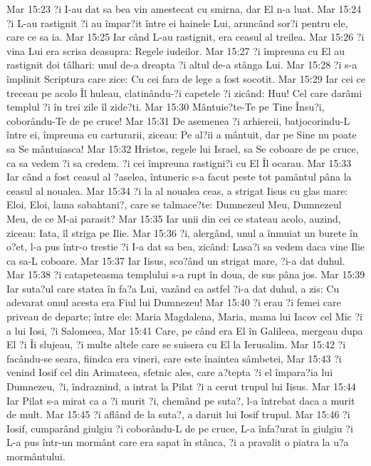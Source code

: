 Mar 15:23  ?i I-au dat sa bea vin amestecat cu smirna, dar El n-a luat.
Mar 15:24  ?i L-au rastignit ?i au împar?it între ei hainele Lui, aruncând sor?i pentru ele, care ce sa ia.
Mar 15:25  Iar când L-au rastignit, era ceasul al treilea.
Mar 15:26  ?i vina Lui era scrisa deasupra: Regele iudeilor.
Mar 15:27  ?i împreuna cu El au rastignit doi tâlhari: unul de-a dreapta ?i altul de-a stânga Lui.
Mar 15:28  ?i s-a împlinit Scriptura care zice: Cu cei fara de lege a fost socotit.
Mar 15:29  Iar cei ce treceau pe acolo Îl huleau, clatinându-?i capetele ?i zicând: Huu! Cel care darâmi templul ?i în trei zile îl zide?ti.
Mar 15:30  Mântuie?te-Te pe Tine Însu?i, coborându-Te de pe cruce!
Mar 15:31  De asemenea ?i arhiereii, batjocorindu-L între ei, împreuna cu carturarii, ziceau: Pe al?ii a mântuit, dar pe Sine nu poate sa Se mântuiasca!
Mar 15:32  Hristos, regele lui Israel, sa Se coboare de pe cruce, ca sa vedem ?i sa credem. ?i cei împreuna rastigni?i cu El Îl ocarau.
Mar 15:33  Iar când a fost ceasul al ?aselea, întuneric s-a facut peste tot pamântul pâna la ceasul al noualea.
Mar 15:34  ?i la al noualea ceas, a strigat Iisus cu glas mare: Eloi, Eloi, lama sabahtani?, care se talmace?te: Dumnezeul Meu, Dumnezeul Meu, de ce M-ai parasit?
Mar 15:35  Iar unii din cei ce stateau acolo, auzind, ziceau: Iata, îl striga pe Ilie.
Mar 15:36  ?i, alergând, unul a înmuiat un burete în o?et, l-a pus într-o trestie ?i I-a dat sa bea, zicând: Lasa?i sa vedem daca vine Ilie ca sa-L coboare.
Mar 15:37  Iar Iisus, sco?ând un strigat mare, ?i-a dat duhul.
Mar 15:38  ?i catapeteasma templului s-a rupt în doua, de sus pâna jos.
Mar 15:39  Iar suta?ul care statea în fa?a Lui, vazând ca astfel ?i-a dat duhul, a zis: Cu adevarat omul acesta era Fiul lui Dumnezeu!
Mar 15:40  ?i erau ?i femei care priveau de departe; între ele: Maria Magdalena, Maria, mama lui Iacov cel Mic ?i a lui Iosi, ?i Salomeea,
Mar 15:41  Care, pe când era El în Galileea, mergeau dupa El ?i Îi slujeau, ?i multe altele care se suisera cu El la Ierusalim.
Mar 15:42  ?i facându-se seara, fiindca era vineri, care este înaintea sâmbetei,
Mar 15:43  ?i venind Iosif cel din Arimateea, sfetnic ales, care a?tepta ?i el împara?ia lui Dumnezeu, ?i, îndraznind, a intrat la Pilat ?i a cerut trupul lui Iisus.
Mar 15:44  Iar Pilat s-a mirat ca a ?i murit ?i, chemând pe suta?, l-a întrebat daca a murit de mult.
Mar 15:45  ?i aflând de la suta?, a daruit lui Iosif trupul.
Mar 15:46  ?i Iosif, cumparând giulgiu ?i coborându-L de pe cruce, L-a înfa?urat în giulgiu ?i L-a pus într-un mormânt care era sapat în stânca, ?i a pravalit o piatra la u?a mormântului.
